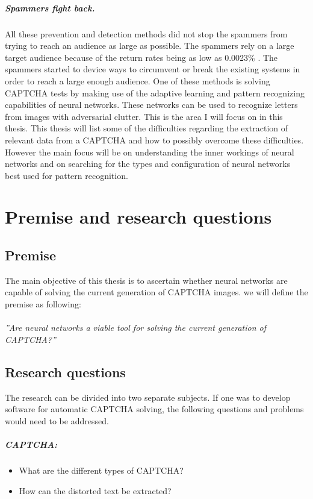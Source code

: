 \documentclass[pdftex,a4paper,12pt,twoside]{report}
\theoremstyle{plain} \newtheorem{theorem}{Theorem} \newtheorem{proposition}{Proposition} \newtheorem{lemma}{Lemma} \newtheorem*{corollary}{Corollary}
\theoremstyle{definition} \newtheorem{definition}{Definition} \newtheorem{conjecture}{Conjecture} \newtheorem*{example}{Example} \newtheorem{algorithm}{Algorithm}
\theoremstyle{remark} \newtheorem*{remark}{Remark} \newtheorem*{note}{Note} \newtheorem{case}{Case}
\newcommand{\captcha}{CAPTCHA}
\begin{document}
\paragraph{Spammers fight back.}
All these prevention and detection methods did not stop the spammers from trying to reach an audience as large  as possible. The spammers rely on a large target audience because of the return rates being as low as 0.0023\% \citep{Cobb2003}. The spammers started to device ways to circumvent or break the existing systems in order to reach a large enough audience. One of these methods is solving CAPTCHA tests by making use of the adaptive learning and pattern recognizing capabilities of neural networks. These networks can be used to recognize letters from images with adversarial clutter.
This is the area I will focus on in this thesis. This thesis will list some of the difficulties regarding the extraction of relevant data from a CAPTCHA and how to possibly overcome these difficulties. However the main focus will be on understanding the inner workings of neural networks and on searching for the types and configuration of neural networks best used for pattern recognition.
\cleardoublepage
\chapter{Premise and research questions}
\label{ch:Premise}
\section{Premise}
\label{sec:Premise}
The main objective of this thesis is to ascertain whether neural networks are capable of solving the current generation of CAPTCHA images. we will define the premise  as following:\\\\
\emph{''Are neural networks a viable tool for solving the current generation of CAPTCHA?''}
\section{Research questions}
\label{sec:researquestions}
The research can be divided into two separate subjects. If one was to develop software for automatic CAPTCHA solving, the following questions and problems would need to be addressed.
\paragraph{\captcha :}
\begin{itemize}
\item What are the different types of CAPTCHA?
\item How can the distorted text be extracted?
\end{itemize}
\end{document}
